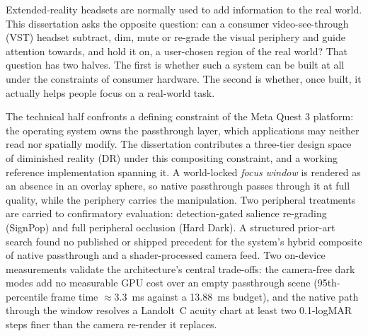 \documentclass[a4paper, 12pt, oneside]{report}
\begin{document}
\thesistitlepage

\hypersetup{pageanchor=false}
\thesisdeclarationpage
\hypersetup{pageanchor=true}

\begin{thesisabstract}
Extended-reality headsets are normally used to add information to the real world. This dissertation
asks the opposite question: can a consumer video-see-through (VST) headset subtract, dim, mute or
re-grade the visual periphery and guide attention towards, and hold it on, a user-chosen region of
the real world? That question has two halves. The first is whether such a system can be built at
all under the constraints of consumer hardware. The second is whether, once built, it actually
helps people focus on a real-world task.

The technical half confronts a defining constraint of the Meta Quest 3 platform: the operating
system owns the passthrough layer, which applications may neither read nor spatially modify. The
dissertation contributes a three-tier design space of diminished reality (DR) under this
compositing constraint, and a working reference implementation spanning it. A world-locked
\textit{focus window} is rendered as an absence in an overlay sphere, so native passthrough passes
through it at full quality, while the periphery carries the manipulation. Two peripheral treatments
are carried to confirmatory evaluation: detection-gated salience re-grading (SignPop) and full
peripheral occlusion (Hard Dark). A structured prior-art search found no published or shipped
precedent for the system's hybrid composite of native passthrough and a shader-processed camera
feed. Two on-device measurements validate the architecture's central trade-offs: the camera-free
dark modes add no measurable GPU cost over an empty passthrough scene (95th-percentile frame time
$\approx$3.3~ms against a 13.88~ms budget), and the native path through the window resolves a
Landolt~C acuity chart at least two 0.1-logMAR steps finer than the camera re-render it replaces.


\end{thesisabstract}
\end{document}
